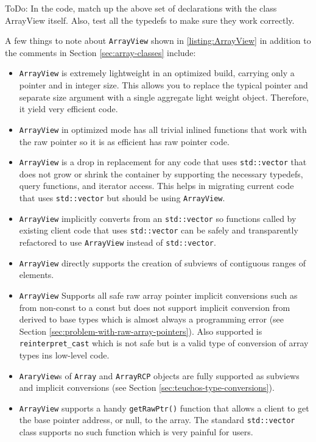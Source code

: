 \documentclass[pdf,ps2pdf,11pt]{SANDreport}
\begin{document}
ToDo: In the code, match up the above set of declarations with the
class ArrayView itself.  Also, test all the typedefs to make sure they
work correctly.

A few things to note about {}\texttt{ArrayView} shown in
{}\ref{listing:ArrayView} in addition to the comments in Section
{}\ref{sec:array-classes} include:

\begin{itemize}

{}\item{}{}\texttt{ArrayView} is extremely lightweight in an optimized
build, carrying only a pointer and in integer size.  This allows you
to replace the typical pointer and separate size argument with a
single aggregate light weight object.  Therefore, it yield very
efficient code.

{}\item{}\texttt{ArrayView} in optimized mode has all trivial inlined
functions that work with the raw pointer so it is as efficient has raw
pointer code.

{}\item{}{}\texttt{ArrayView} is a drop in replacement for any code
that uses {}\texttt{std::vector} that does not grow or shrink the
container by supporting the necessary typedefs, query functions, and
iterator access.  This helps in migrating current code that uses
{}\texttt{std::vector} but should be using {}\texttt{ArrayView}.

{}\item{}{}\texttt{ArrayView} implicitly converts from an
{}\texttt{std::vector} so functions called by existing client code
that uses {}\texttt{std::vector} can be safely and transparently
refactored to use {}\texttt{ArrayView} instead of
{}\texttt{std::vector}.

{}\item{}\texttt{ArrayView} directly supports the creation of subviews
of contiguous ranges of elements.

{}\item{}\texttt{ArrayView} Supports all safe raw array pointer
implicit conversions such as from non-const to a const but does not
support implicit conversion from derived to base types which is almost
always a programming error (see Section
{}\ref{sec:problem-with-raw-array-pointers}).  Also supported is
{}\texttt{reinterpret\_cast} which is not safe but is a valid type of
conversion of array types ins low-level code.

{}\item{}\texttt{AraryView}s of {}\texttt{Array} and
{}\texttt{ArrayRCP} objects are fully supported as subviews and
implicit conversions (see Section
{}\ref{sec:teuchos-type-conversions}).

{}\item{}\texttt{ArrayView} supports a handy {}\texttt{getRawPtr()}
function that allows a client to get the base pointer address, or
null, to the array.  The standard {}\texttt{std::vector} class
supports no such function which is very painful for users.

\end{itemize}
\end{document}
